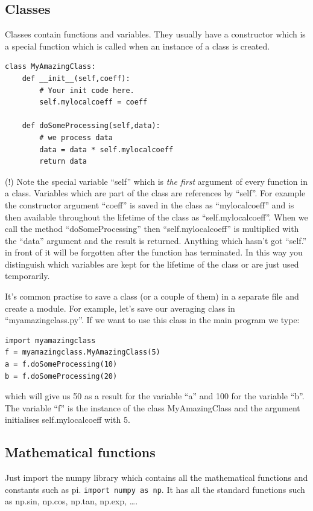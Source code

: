 \documentclass[12pt,a4paper]{article}
\begin{document}
\subsection{Classes}
Classes contain functions and variables. They usually
have a constructor which is a special function which is called
when an instance of a class is created.
\begin{verbatim}
class MyAmazingClass:
    def __init__(self,coeff):
        # Your init code here.
        self.mylocalcoeff = coeff

    def doSomeProcessing(self,data):
        # we process data
        data = data * self.mylocalcoeff
        return data
\end{verbatim}
(!) Note the special variable ``self'' which is \textsl{the first}
argument of every function in a class. Variables which
are part of the class are references by ``self''. For
example the constructor argument ``coeff'' is saved
in the class as ``mylocalcoeff'' and is then available
throughout the lifetime of the class as ``self.mylocalcoeff''. When we call
the method ``doSomeProcessing'' then ``self.mylocalcoeff''
is multiplied with the ``data'' argument and the result
is returned. Anything which hasn't got ``self.'' in front
of it will be forgotten after the function has terminated.
In this way you distinguish which variables are kept
for the lifetime of the class or
are just used temporarily.

It's common practise to save a class (or a couple of them) in a separate
file and create a module. For example, let's save our averaging class in ``myamazingclass.py''.
If we want to use this class in the main program we type:
\begin{verbatim}
import myamazingclass
f = myamazingclass.MyAmazingClass(5)
a = f.doSomeProcessing(10)
b = f.doSomeProcessing(20)
\end{verbatim}
which will give us 50 as a result for the variable ``a'' and
100 for the variable ``b''. The variable ``f'' is the instance
of the class MyAmazingClass and the argument initialises
self.mylocalcoeff with 5.


\subsection{Mathematical functions}
Just import the numpy library which contains all the
mathematical functions and constants such as pi.
\texttt{import numpy as np}. It has all the standard functions such
as np.sin, np.cos, np.tan, np.exp, \ldots.
\end{document}
